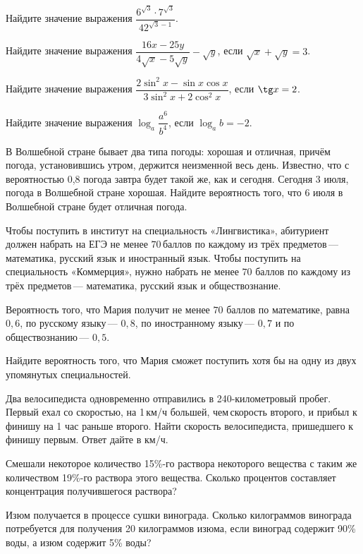 \begin{consultation}
	\begin{listofex}
		\item Найдите значение выражения \( \dfrac{6^{\sqrt{3}}\cdot7^{\sqrt{3}}}{42^{\sqrt{3}-1}} \).
		\item Найдите значение выражения \( \dfrac{16x-25y}{4\sqrt{x}-5\sqrt{y}}-\sqrt{y} \), если \( \sqrt{x}+\sqrt{y}=3 \).
		\item Найдите значение выражения \( \dfrac{2\sin^2x-\sin x\cos x}{3\sin^2x+2\cos^2x} \), если \( \tg x = 2 \).
		\item Найдите значение выражения \( \log_a\dfrac{a^6}{b^4} \), если \( \log_a b = -2 \).
		\item В Волшебной стране бывает два типа погоды: хорошая и отличная, причём погода, установившись утром, держится неизменной весь день. Известно, что с вероятностью 0,8 погода завтра будет такой же, как и сегодня. Сегодня 3 июля, погода в Волшебной стране хорошая. Найдите вероятность того, что 6 июля в Волшебной стране будет отличная погода.
		\item Чтобы поступить в институт на специальность «Лингвистика», абитуриент должен набрать на ЕГЭ не менее \( 70 \) баллов по каждому из трёх предметов --- математика, русский язык и иностранный язык. Чтобы поступить на специальность «Коммерция», нужно набрать не менее \( 70 \) баллов по каждому из трёх предметов --- математика, русский язык и обществознание.
		
		Вероятность того, что Мария получит не менее \( 70 \) баллов по математике, равна \( 0,6 \), по русскому языку --- \( 0,8 \), по иностранному языку --- \( 0,7 \) и по обществознанию --- \( 0,5 \).
		
		Найдите вероятность того, что Мария сможет поступить хотя бы на одну из двух упомянутых специальностей.
		\item Два велосипедиста одновременно отправились в 240-километровый пробег. Первый ехал со скоростью, на 1 км/ч большей, чем скорость второго, и прибыл к финишу на 1 час раньше второго. Найти скорость велосипедиста, пришедшего к финишу первым. Ответ дайте в км/ч.
		\item Смешали некоторое количество 15\%-го раствора некоторого вещества с таким же количеством 19\%-го раствора этого вещества. Сколько процентов составляет концентрация получившегося раствора?
		\item Изюм получается в процессе сушки винограда. Сколько килограммов винограда потребуется для получения 20 килограммов изюма, если виноград содержит 90\% воды, а изюм содержит 5\% воды?
	\end{listofex}
\end{consultation}
